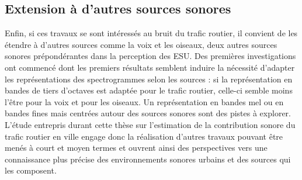 \subsection*{Extension à d'autres sources sonores}
Enfin, si ces travaux se sont intéressés au bruit du trafic routier, il convient de les étendre à d'autres sources comme la voix et les oiseaux, deux autres sources sonores prépondérantes dans la perception des ESU. Des premières investigations ont commencé dont les premiers résultats semblent induire la nécessité d'adapter les représentations des spectrogrammes selon les sources : si la représentation en bandes de tiers d'octaves est adaptée pour le trafic routier, celle-ci semble moins l'être pour la voix et pour les oiseaux. Un représentation en bandes mel ou en bandes fines mais centrées autour des sources sonores sont des pistes à explorer. \\

L'étude entrepris durant cette thèse sur l'estimation de la contribution sonore du trafic routier en ville engage donc la réalisation d'autres travaux pouvant être menés à court et moyen termes et ouvrent ainsi des perspectives vers une connaissance plus précise des environnements sonores urbains et des sources qui les composent.






